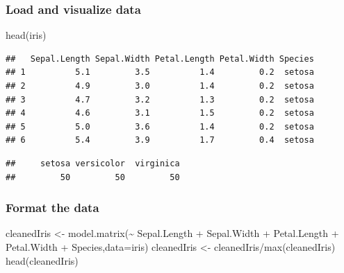 \documentclass[
]{article}
\newenvironment{Shaded}{\begin{snugshade}}{\end{snugshade}}
\newcommand{\AttributeTok}[1]{\textcolor[rgb]{0.77,0.63,0.00}{#1}}
\newcommand{\CommentTok}[1]{\textcolor[rgb]{0.56,0.35,0.01}{\textit{#1}}}
\newcommand{\FunctionTok}[1]{\textcolor[rgb]{0.00,0.00,0.00}{#1}}
\newcommand{\NormalTok}[1]{#1}
\newcommand{\OtherTok}[1]{\textcolor[rgb]{0.56,0.35,0.01}{#1}}
\newcommand{\SpecialCharTok}[1]{\textcolor[rgb]{0.00,0.00,0.00}{#1}}
\begin{document}
\hypertarget{load-and-visualize-data}{%
\subsubsection{Load and visualize data}\label{load-and-visualize-data}}

\begin{Shaded}
\begin{Highlighting}[]
\FunctionTok{head}\NormalTok{(iris)}
\end{Highlighting}
\end{Shaded}

\begin{verbatim}
##   Sepal.Length Sepal.Width Petal.Length Petal.Width Species
## 1          5.1         3.5          1.4         0.2  setosa
## 2          4.9         3.0          1.4         0.2  setosa
## 3          4.7         3.2          1.3         0.2  setosa
## 4          4.6         3.1          1.5         0.2  setosa
## 5          5.0         3.6          1.4         0.2  setosa
## 6          5.4         3.9          1.7         0.4  setosa
\end{verbatim}

\begin{Shaded}
\end{Shaded}

\begin{verbatim}
##     setosa versicolor  virginica 
##         50         50         50
\end{verbatim}

\hypertarget{format-the-data}{%
\subsubsection{Format the data}\label{format-the-data}}

\begin{Shaded}
\begin{Highlighting}[]
\NormalTok{cleanedIris }\OtherTok{\textless{}{-}} \FunctionTok{model.matrix}\NormalTok{(}\SpecialCharTok{\textasciitilde{}}\NormalTok{ Sepal.Length }\SpecialCharTok{+}\NormalTok{ Sepal.Width }\SpecialCharTok{+}\NormalTok{ Petal.Length }\SpecialCharTok{+}\NormalTok{ Petal.Width }\SpecialCharTok{+}\NormalTok{ Species,}\AttributeTok{data=}\NormalTok{iris)}
\NormalTok{cleanedIris }\OtherTok{\textless{}{-}}\NormalTok{ cleanedIris}\SpecialCharTok{/}\FunctionTok{max}\NormalTok{(cleanedIris)}
\FunctionTok{head}\NormalTok{(cleanedIris)}
\end{Highlighting}
\end{Shaded}
\end{document}
